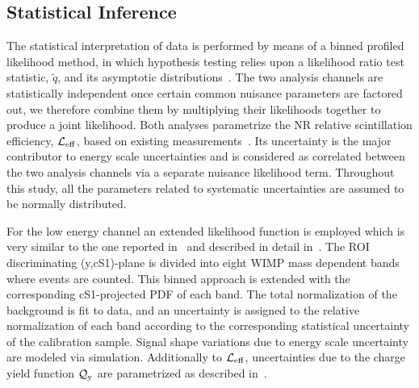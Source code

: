 
\subsection{Statistical Inference }
\label{sec:LikelihoodFunction}
The statistical interpretation of data is performed by means of a binned profiled likelihood method, in which hypothesis testing relies upon a likelihood ratio test statistic, $\tilde{q}$, 
and its asymptotic distributions~\cite{asympt}. The two analysis channels are statistically independent once certain common nuisance parameters are factored out, we therefore combine them by multiplying their likelihoods together to produce a joint likelihood.
Both analyses parametrize the NR relative scintillation efficiency, $\mathcal{L}_{\mathrm{eff}}$, based on existing measurements~\cite{run8Result}. Its uncertainty is the major contributor to energy scale uncertainties and is considered as correlated between the two analysis channels via a separate nuisance likelihood term.
Throughout this study, all the parameters related to systematic uncertainties are assumed to be normally distributed.

For the low energy channel an extended likelihood function is employed which is very similar to the one reported in~\cite{Aprile:2011hx} and described in detail in~\cite{xe100_run_combination}. 
The ROI discriminating (y,cS1)-plane is divided into eight WIMP mass dependent bands where events are counted. This binned approach is extended with the corresponding cS1-projected PDF of each band. The total normalization of the background is fit to data, and an uncertainty is assigned to the relative normalization of each band according to the corresponding statistical uncertainty of the calibration sample.
Signal shape variations due to energy scale uncertainty are modeled via simulation. Additionally to $\mathcal{L}_{\mathrm{eff}}$, uncertainties due to the charge yield function $\mathcal{Q}_{\mathrm{y}}$ are parametrized as described in~\cite{DataMCXenon}.

